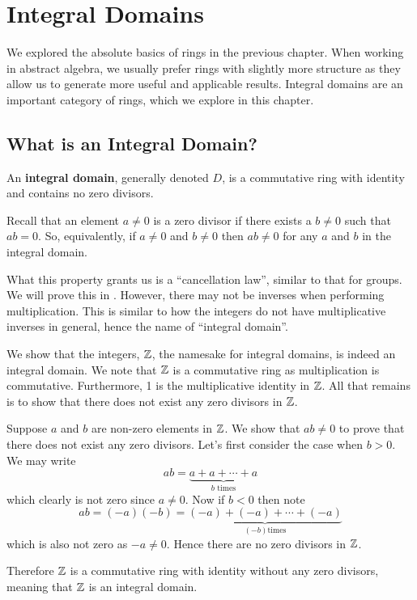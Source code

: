 \chapter{Integral Domains}
We explored the absolute basics of rings in the previous chapter. When working in abstract algebra, we usually prefer rings with slightly more structure as they allow us to generate more useful and applicable results. Integral domains are an important category of rings, which we explore in this chapter.

\section{What is an Integral Domain?}
\begin{definition}
    An \textbf{integral domain}, generally denoted $D$, is a commutative ring with identity and contains no zero divisors.
\end{definition}
\begin{remark}
    Recall that an element $a \neq 0$ is a zero divisor if there exists a $b \neq 0$ such that $ab = 0$. So, equivalently, if $a \neq 0$ and $b \neq 0$ then $ab \neq 0$ for any $a$ and $b$ in the integral domain.
\end{remark}
\begin{remark}
    What this property grants us is a ``cancellation law'', similar to that for groups. We will prove this in . However, there may not be inverses when performing multiplication. This is similar to how the integers do not have multiplicative inverses in general, hence the name of ``integral domain''.
\end{remark}

\begin{example}\label{example-integers-is-integral-domain}
    We show that the integers, $\mathbb{Z}$, the namesake for integral domains, is indeed an integral domain. We note that $\mathbb{Z}$ is a commutative ring as multiplication is commutative. Furthermore, 1 is the multiplicative identity in $\mathbb{Z}$. All that remains is to show that there does not exist any zero divisors in $\mathbb{Z}$.

    Suppose $a$ and $b$ are non-zero elements in $\mathbb{Z}$. We show that $ab \neq 0$ to prove that there does not exist any zero divisors. Let's first consider the case when $b > 0$. We may write
    \[
        ab = \underbrace{a + a + \cdots + a}_{b \text{ times}}
    \]
    which clearly is not zero since $a \neq 0$. Now if $b < 0$ then note
    \[
        ab = (-a)(-b) = \underbrace{(-a) + (-a) + \cdots + (-a)}_{(-b) \text{times}}
    \]
    which is also not zero as $-a \neq 0$. Hence there are no zero divisors in $\mathbb{Z}$.

    Therefore $\mathbb{Z}$ is a commutative ring with identity without any zero divisors, meaning that $\mathbb{Z}$ is an integral domain.
\end{example}

